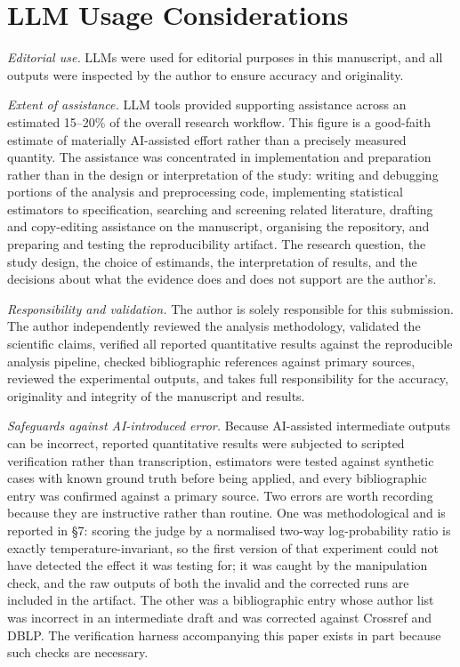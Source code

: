 \documentclass[conference]{IEEEtran}
\begin{document}
\section{LLM Usage Considerations}

\textit{Editorial use.} LLMs were used for editorial purposes in this manuscript, and all outputs were inspected by the author to ensure accuracy and originality.

\textit{Extent of assistance.} LLM tools provided supporting assistance across an estimated 15--20\% of the overall research workflow. This figure is a good-faith estimate of materially AI-assisted effort rather than a precisely measured quantity. The assistance was concentrated in implementation and preparation rather than in the design or interpretation of the study: writing and debugging portions of the analysis and preprocessing code, implementing statistical estimators to specification, searching and screening related literature, drafting and copy-editing assistance on the manuscript, organising the repository, and preparing and testing the reproducibility artifact. The research question, the study design, the choice of estimands, the interpretation of results, and the decisions about what the evidence does and does not support are the author's.

\textit{Responsibility and validation.} The author is solely responsible for this submission. The author independently reviewed the analysis methodology, validated the scientific claims, verified all reported quantitative results against the reproducible analysis pipeline, checked bibliographic references against primary sources, reviewed the experimental outputs, and takes full responsibility for the accuracy, originality and integrity of the manuscript and results.

\textit{Safeguards against AI-introduced error.} Because AI-assisted intermediate outputs can be incorrect, reported quantitative results were subjected to scripted verification rather than transcription, estimators were tested against synthetic cases with known ground truth before being applied, and every bibliographic entry was confirmed against a primary source. Two errors are worth recording because they are instructive rather than routine. One was methodological and is reported in \S7: scoring the judge by a normalised two-way log-probability ratio is exactly temperature-invariant, so the first version of that experiment could not have detected the effect it was testing for; it was caught by the manipulation check, and the raw outputs of both the invalid and the corrected runs are included in the artifact. The other was a bibliographic entry whose author list was incorrect in an intermediate draft and was corrected against Crossref and DBLP. The verification harness accompanying this paper exists in part because such checks are necessary.
\end{document}
